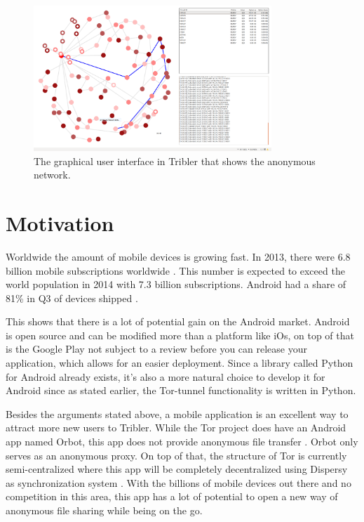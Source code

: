 \documentclass[11pt]{article}
\begin{document}
\begin{figure}[!t]
		\centering
		\includegraphics[width=0.8\textwidth]{graphics/8hop.png}
		\caption{The graphical user interface in Tribler that shows the anonymous network.}
		\label{fig:anon_downloads}
	\end{figure}

\section{Motivation}
Worldwide the amount of mobile devices is growing fast. In 2013, there were 6.8 billion mobile subscriptions worldwide \cite{itustatistics}. This number is expected to exceed the world population in 2014 with 7.3 billion subscriptions. Android had a share of 81\% in Q3 of devices shipped \cite{forbesandroidmarket}.

This shows that there is a lot of potential gain on the Android market. Android is open source and can be modified more than a platform like iOs, on top of that is the Google Play not subject to a review before you can release your application, which allows for an easier deployment. Since a library called Python for Android already exists, it's also a more natural choice to develop it for Android since as stated earlier, the Tor-tunnel functionality is written in Python.

Besides the arguments stated above, a mobile application is an excellent way to attract more new users to Tribler. While the Tor project does have an Android app named Orbot, this app does not provide anonymous file transfer \cite{tororbot, googleplayorbot}. Orbot only serves as an anonymous proxy. On top of that, the structure of Tor is currently semi-centralized \cite{jagerman2014fifteen} where this app will be completely decentralized using Dispersy as synchronization system \cite{zeilemaker2013dispersy}. With the billions of mobile devices out there and no competition in this area, this app has a lot of potential to open a new way of anonymous file sharing while being on the go.
\end{document}
